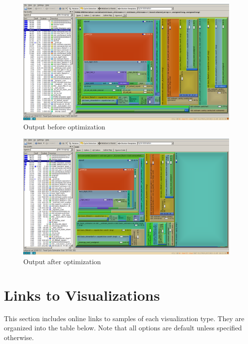 \documentclass[a4paper,11pt]{article}
\begin{document}
\begin{appendices}
\begin{figure}[H]
\includegraphics[width=\textwidth]{before_opti.png}
\caption{Output before optimization}
\label{fig:before}
\end{figure}
\vspace{-0.5cm}
\begin{figure}[H]
\includegraphics[width=\textwidth]{after_opti.png}
\caption{Output after optimization}
\label{fig:after}
\end{figure}

\newpage
\section{Links to Visualizations}\label{links}

This section includes online links to samples of each visualization type.  They are organized into the table below.  Note that all options are default unless specified otherwise.  


\end{appendices}
\end{document}
